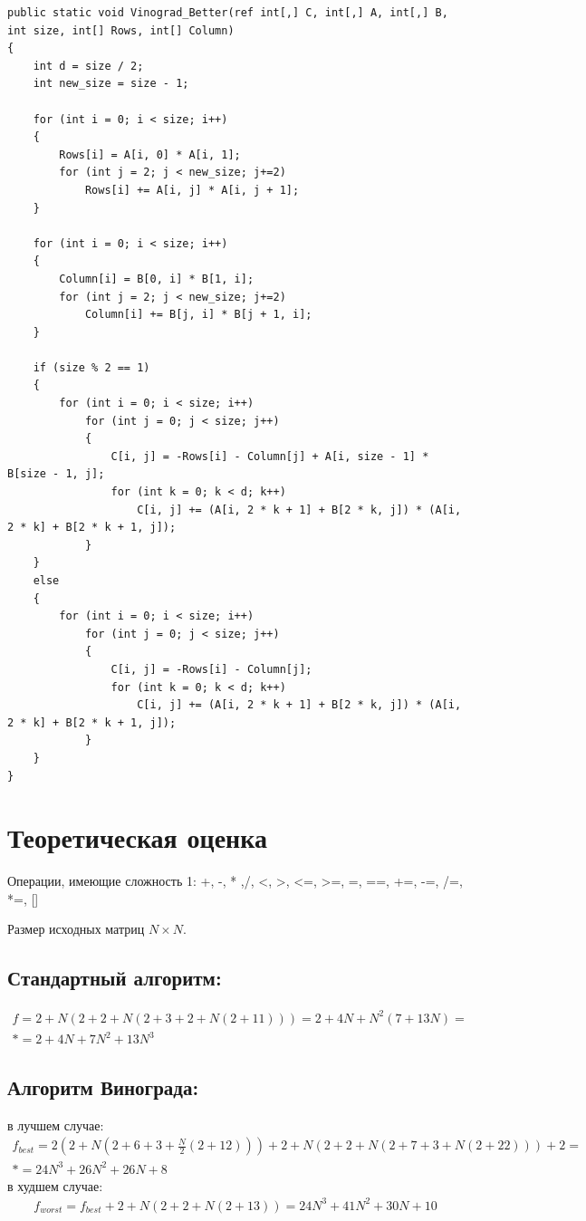 \documentclass[a4paper,12pt]{article}
\begin{document}
\begin{lstlisting}[label=some-code1,caption={Улучшенный алгоритм Винограда}]
public static void Vinograd_Better(ref int[,] C, int[,] A, int[,] B, int size, int[] Rows, int[] Column)
{
	int d = size / 2;
	int new_size = size - 1;
	
	for (int i = 0; i < size; i++)
	{
		Rows[i] = A[i, 0] * A[i, 1];
		for (int j = 2; j < new_size; j+=2)
			Rows[i] += A[i, j] * A[i, j + 1];
	}
	
	for (int i = 0; i < size; i++)
	{
		Column[i] = B[0, i] * B[1, i];
		for (int j = 2; j < new_size; j+=2)
			Column[i] += B[j, i] * B[j + 1, i];
	}
	
	if (size % 2 == 1)
	{
		for (int i = 0; i < size; i++)
			for (int j = 0; j < size; j++)
			{
				C[i, j] = -Rows[i] - Column[j] + A[i, size - 1] * B[size - 1, j];
				for (int k = 0; k < d; k++)
					C[i, j] += (A[i, 2 * k + 1] + B[2 * k, j]) * (A[i, 2 * k] + B[2 * k + 1, j]);
			}
	}
	else
	{
		for (int i = 0; i < size; i++)
			for (int j = 0; j < size; j++)
			{
				C[i, j] = -Rows[i] - Column[j];
				for (int k = 0; k < d; k++)
					C[i, j] += (A[i, 2 * k + 1] + B[2 * k, j]) * (A[i, 2 * k] + B[2 * k + 1, j]);
			}
	}
}
\end{lstlisting}

\section{Теоретическая оценка}
Операции, имеющие сложность 1: +, -, * ,/, <, >, <=, >=, =, ==, +=, -=, /=, *=, []

Размер исходных матриц $N \times N$.

\subsection{Стандартный алгоритм:} 
\begin{gather*}
	f = 2+N(2+2+N(2+3+2+N(2+11))) = 2+4N+N^2(7+13N)=\\*=2+4N+7N^2+13N^3
\end{gather*}

\subsection{Алгоритм Винограда:} 
в лучшем случае:
\begin{gather*}
	f_{best} = 2(2+N(2+6+3+\frac{N}{2}(2+12)))+2+N(2+2+N(2+7+3+N(2+22)))+2 = \\* = 24N^3+26N^2+26N+8
\end{gather*}
в худшем случае:
\begin{gather*}
	f_{worst} = f_{best}+2+N(2+2+N(2+13)) = 24N^3+41N^2+30N+10
\end{gather*}
\end{document}
